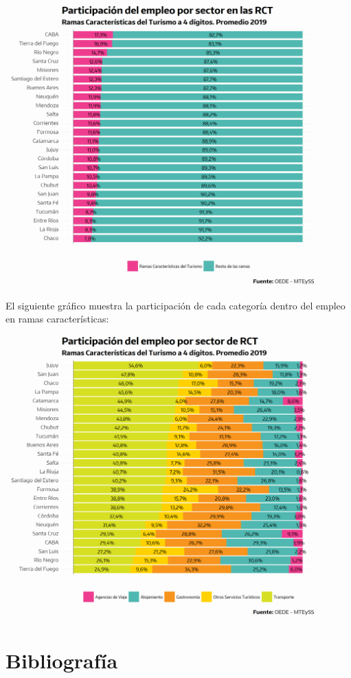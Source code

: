 \documentclass[
  openany]{book}
\begin{document}
\begin{center}\includegraphics[width=0.8\linewidth]{imagenes/empleo.prov.part} \end{center}

El siguiente gráfico muestra la participación de cada categoría dentro del empleo en ramas características:

\begin{center}\includegraphics[width=0.8\linewidth]{imagenes/empleo.prov.part.agrup} \end{center}

\hypertarget{bibliografuxeda}{%
\chapter*{\texorpdfstring{\textbf{Bibliografía}}{Bibliografía}}\label{bibliografuxeda}}

  
\end{document}
